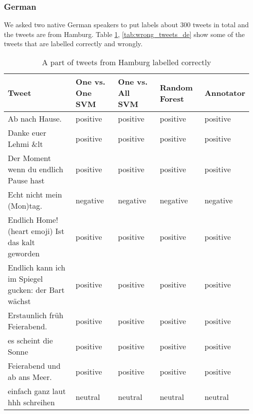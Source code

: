 \subsubsection{German}
We asked two native German speakers to put labels about 300 tweets in total and the tweets are from Hamburg.
Table \ref{tab:correct_tweets_de}, \ref{tab:wrong_tweets_de}  show some of the tweets that are labelled correctly and wrongly.
\begin{table}[ht]
	\caption{A part of tweets from Hamburg labelled correctly}
	\begin{tabular}{|p{5cm}|p{1.8cm}|p{1.8cm}|p{1.8cm}|p{1.8cm}|} \hline
	Tweet & One vs. One SVM &One vs. All SVM &Random Forest & Annotator\\ \hline

	Ab nach Hause. &positive&positive&positive&positive\\ \hline
	Danke euer Lehmi \&lt&positive&positive&positive&positive\\ \hline
	Der Moment wenn du endlich Pause hast &positive&positive&positive&positive\\ \hline
	Echt nicht mein (Mon)tag. &negative&negative&negative&negative\\ \hline
	Endlich Home! (heart emoji) Ist das kalt geworden &positive&positive&positive&positive\\ \hline

	Endlich kann ich im Spiegel gucken: der Bart w\"achst &positive&positive&positive&positive\\ \hline
	Erstaunlich fr\"uh Feierabend. &positive&positive&positive&positive\\ \hline
	es scheint die Sonne &positive&positive&positive&positive\\ \hline
	Feierabend und ab ans Meer. &positive&positive&positive&positive\\ \hline
	einfach ganz laut hhh schreihen&neutral &neutral&neutral&neutral\\ \hline

	
	
	\end{tabular}
	\label{tab:correct_tweets_de}
\end{table}


